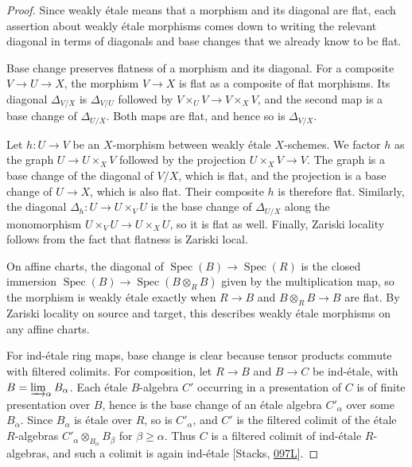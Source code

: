 \documentclass[11pt]{article}
\begin{document}
\begin{proof}[{Proof}]\label{bp13}%
Since weakly étale means that a morphism and its diagonal are flat, each assertion about weakly étale morphisms comes down to writing the relevant diagonal in terms of diagonals and base changes that we already know to be flat.

Base change preserves flatness of a morphism and its diagonal. For a composite \(V\to U\to X\), the morphism \(V\to X\) is flat as a composite of flat morphisms. Its diagonal \(\Delta_{V/X}\) is \(\Delta_{V/U}\) followed by \(V\times_UV\to V\times_XV\), and the second map is a base change of \(\Delta_{U/X}\). Both maps are flat, and hence so is \(\Delta_{V/X}\).

Let \(h:U\to V\) be an \(X\)-morphism between weakly étale \(X\)-schemes. We factor \(h\) as the graph \(U\to U\times_XV\) followed by the projection \(U\times_XV\to V\). The graph is a base change of the diagonal of \(V/X\), which is flat, and the projection is a base change of \(U\to X\), which is also flat. Their composite \(h\) is therefore flat. Similarly, the diagonal \(\Delta_h:U\to
U\times_VU\) is the base change of \(\Delta_{U/X}\) along the monomorphism \(U\times_VU\to U\times_XU\), so it is flat as well. Finally, Zariski locality follows from the fact that flatness is Zariski local.

On affine charts, the diagonal of \(\operatorname{Spec}(B)\to\operatorname{Spec}(R)\) is the closed immersion \(\operatorname{Spec}(B)\to\operatorname{Spec}(B\otimes_RB)\) given by the multiplication map, so the morphism is weakly étale exactly when \(R\to B\) and \(B\otimes_RB\to B\) are flat. By Zariski locality on source and target, this describes weakly étale morphisms on any affine charts.

For ind-étale ring maps, base change is clear because tensor products commute with filtered colimits. For composition, let \(R\to B\) and \(B\to C\) be ind-étale, with \(B=\varinjlim_\alpha B_\alpha\). Each étale \(B\)-algebra \(C'\) occurring in a presentation of \(C\) is of finite presentation over \(B\), hence is the base change of an étale algebra \(C'_\alpha\) over some \(B_\alpha\). Since \(B_\alpha\) is étale over \(R\), so is \(C'_\alpha\), and \(C'\) is the filtered colimit of the étale \(R\)-algebras \(C'_\alpha\otimes_{B_\alpha}B_\beta\) for \(\beta\geq\alpha\). Thus \(C\) is a filtered colimit of ind-étale \(R\)-algebras, and such a colimit is again ind-étale [Stacks, \href{https://stacks.math.columbia.edu/tag/097L}{097L}].
\end{proof}
\end{document}
